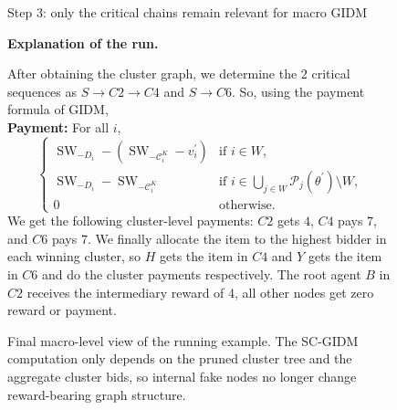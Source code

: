 \documentclass[sigconf]{aamas}
\theoremstyle{definition}
\theoremstyle{remark}
\newcommand{\SW}{\operatorname{SW}}
\begin{document}
\begin{figure}[t]
\centering
\begin{minipage}[t]{0.42\textwidth}
\centering
{}

\small Step 3: only the critical chains remain relevant for macro GIDM
\end{minipage}\hfill
\begin{minipage}[t]{0.54\textwidth}
\small
\textbf{Explanation of the run.} 

\medskip 

After obtaining the cluster graph, we determine the $2$ critical sequences as $S \rightarrow C2 \rightarrow C4$ and $S \rightarrow C6$. 
So, using the payment formula of GIDM, 
\\
\textbf{Payment:} For all $i$,
\[
\begin{cases}
\SW_{-D_i} - (\SW_{-\mathcal{C}_i^{K}} - v_i^\prime) & \text{if } i\in W,\\
\SW_{-D_i} - \SW_{-\mathcal{C}_i^{K}} & \text{if } i\in \bigcup_{j\in W}\mathcal{P}_j(\theta^\prime)\setminus W,\\
0 & \text{otherwise.}
\end{cases}
\]
We get the following cluster-level payments: $C2$ gets $4$, $C4$ pays $7$, and $C6$ pays $7$.
We finally allocate the item to the highest bidder in each winning cluster, so $H$ gets the item in $C4$ and $Y$ gets the item in $C6$ and do the cluster payments respectively.
The root agent $B$ in $C2$ receives the intermediary reward of $4$, all other nodes get zero reward or payment.


\end{minipage}
\caption{Final macro-level view of the running example. The SC-GIDM computation only depends on the pruned cluster tree and the aggregate cluster bids, so internal fake nodes no longer change reward-bearing graph structure.}
\label{fig:scgidmstepstwo}
\end{figure}
\end{document}
